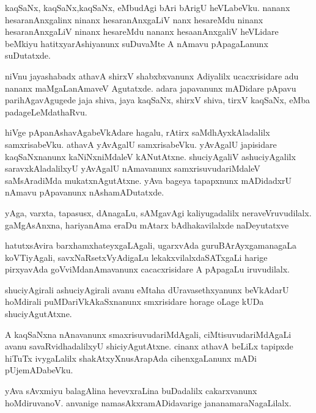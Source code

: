 \documentclass{article}
\begin{document}
\begin{mn}%
kaqSaNx, kaqSaNx,kaqSaNx, eMbudAgi bAri bArigU heVLabeVku. nananx hesaranAnxgalinx ninanx 
hesaranAnxgaLiV nanx hesareMdu ninanx hesaranAnxgaLiV ninanx hesareMdu nananx 
hesaanAnxgaliV heVLidare beMkiyu hatitxyarAshiyanunx suDuvaMte A nAmavu pApagaLanunx 
suDutatxde.
\end{mn}

\begin{mn}%
niVnu jayashabadx athavA shirxV shabxbxvanunx Adiyalilx ucacxrisidare adu nananx 
maMgaLanAmaveV Agutatxde. adara japavanunx mADidare pApavu parihAgavAgugede jaja shiva, 
jaya kaqSaNx, shirxV shiva, tirxV  kaqSaNx, eMba padageLeMdathaRvu.
\end{mn}

\begin{mn}%
hiVge pApanAshavAgabeVkAdare hagalu, rAtirx saMdhAyxkAladalilx samxrisabeVku. athavA 
yAvAgalU samxrisabeVku. yAvAgalU japisidare kaqSaNxnanunx kaNiNxniMdaleV kANutAtxne. 
shuciyAgaliV ashuciyAgalilx saravxkAladalilxyU yAvAgalU nAmavanunx samxrisuvudariMdaleV 
saMsAradiMda mukatxnAgutAtxne. yAva bageya tapapxnunx mADidadxrU nAmavu pApavanunx 
nAshamADutatxde.
\end{mn}

\begin{mn}%
yAga, varxta, tapasusx, dAnagaLu, sAMgavAgi kaliyugadalilx neraveVruvudilalx. gaMgAsAnxna, 
hariyanAma eraDu mAtarx bAdhakavilalxde naDeyutatxve
\end{mn}

\begin{mn}%
hatutxsAvira barxhamxhateyxgaLAgali, ugarxvAda guruBArAyxgamanagaLa koVTiyAgali, 
savxNaRsetxVyAdigaLu lekakxvilalxdaSATxgaLi harige pirxyavAda goVviMdanAmavanunx 
cacacxrisidare A pApagaLu iruvudilalx.
\end{mn}

\begin{mn}%
shuciyAgirali ashuciyAgirali avanu eMtaha dUravasethxyanunx  beVkAdarU hoMdirali 
puMDariVkAkaSxnanunx smxrisidare horage oLage kUDa shuciyAgutAtxne.
\end{mn}

\begin{mn}%
A kaqSaNxna nAnavanunx smaxrisuvudariMdAgali, ciMtisuvudariMdAgaLi avanu 
savaRvidhadalilxyU shiciyAgutAtxne. cinanx athavA beLiLx tapipxde hiTuTx ivygaLalilx 
shakAtxyXnusArapAda cihenxgaLanunx mADi pUjemADabeVku.
\end{mn}

\begin{mn}%
yAva sAvxmiyu balagAlina hevevxraLina buDadalilx cakarxvanunx hoMdiruvanoV. anvanige 
namasAkxramADidavarige jananamaraNagaLilalx.
\end{mn}
\end{document}
